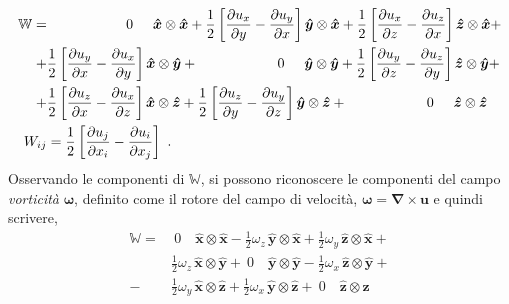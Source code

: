 \begin{equation}\label{eqn:w}
\begin{aligned}
 \mathbb{W} = &  \hspace{2.0cm} 0 \hspace{0.5cm}                    \bm{\hat{x}}\otimes\bm{\hat{x}} + 
                \frac{1}{2}\left[ \dfrac{\partial{u_x}}{\partial{y}} -  \dfrac{\partial{u_y}}{\partial{x}} \right]  \bm{\hat{y}}\otimes\bm{\hat{x}} +
                \frac{1}{2}\left[ \dfrac{\partial{u_x}}{\partial{z}} -  \dfrac{\partial{u_z}}{\partial{x}} \right]  \bm{\hat{z}}\otimes\bm{\hat{x}} + \\
            + & \frac{1}{2}\left[ \dfrac{\partial{u_y}}{\partial{x}} -  \dfrac{\partial{u_x}}{\partial{y}} \right]  \bm{\hat{x}}\otimes\bm{\hat{y}} +
                 \hspace{2.0cm} 0 \hspace{0.5cm}                    \bm{\hat{y}}\otimes\bm{\hat{y}} +
                \frac{1}{2}\left[ \dfrac{\partial{u_y}}{\partial{z}} -  \dfrac{\partial{u_z}}{\partial{y}} \right]  \bm{\hat{z}}\otimes\bm{\hat{y}} + \\
            + & \frac{1}{2}\left[ \dfrac{\partial{u_z}}{\partial{x}} -  \dfrac{\partial{u_x}}{\partial{z}} \right]  \bm{\hat{x}}\otimes\bm{\hat{z}} +
                \frac{1}{2}\left[ \dfrac{\partial{u_z}}{\partial{y}} -  \dfrac{\partial{u_y}}{\partial{z}} \right]  \bm{\hat{y}}\otimes\bm{\hat{z}} +
                 \hspace{2.0cm} 0 \hspace{0.5cm}                    \bm{\hat{z}}\otimes\bm{\hat{z}} \\
  W_{ij} & = \dfrac{1}{2}\left[ \dfrac{\partial{u_j}}{\partial{x_i}} - \dfrac{\partial{u_i}}{\partial{x_j}} \right] \ .
\end{aligned}
\end{equation}
Osservando le componenti di $\mathbb{W}$, si possono riconoscere le componenti del campo \textit{vorticità} $\bm{\omega}$, definito come il rotore del campo di velocità, $\bm{\omega} = \bm{\nabla} \times \bm{u}$ e quindi scrivere,
\begin{equation}\label{eqn:w}
\begin{aligned}
 \mathbb{W} = & \ 0 \quad               \bm{\hat{x}}\otimes\bm{\hat{x}}   
              - \frac{1}{2} \omega_z \, \bm{\hat{y}}\otimes\bm{\hat{x}} +
                \frac{1}{2} \omega_y \, \bm{\hat{z}}\otimes\bm{\hat{x}} + \\
              & \frac{1}{2} \omega_z \, \bm{\hat{x}}\otimes\bm{\hat{y}} +
                \ 0 \quad               \bm{\hat{y}}\otimes\bm{\hat{y}}  
              - \frac{1}{2} \omega_x \, \bm{\hat{z}}\otimes\bm{\hat{y}} + \\
            - & \frac{1}{2} \omega_y \, \bm{\hat{x}}\otimes\bm{\hat{z}} +
                \frac{1}{2} \omega_x \, \bm{\hat{y}}\otimes\bm{\hat{z}} +
                \ 0 \quad               \bm{\hat{z}}\otimes\bm{\hat{z}} \\
\end{aligned}
\end{equation}

